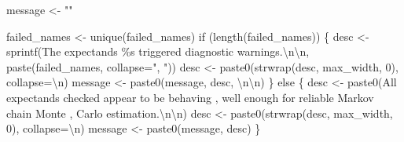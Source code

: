 \documentclass[
  letterpaper,
  DIV=11,
  numbers=noendperiod]{scrartcl}
\newenvironment{Shaded}{\begin{snugshade}}{\end{snugshade}}
\newcommand{\CharTok}[1]{\textcolor[rgb]{0.13,0.47,0.30}{#1}}
\newcommand{\ControlFlowTok}[1]{\textcolor[rgb]{0.00,0.23,0.31}{#1}}
\newcommand{\DecValTok}[1]{\textcolor[rgb]{0.68,0.00,0.00}{#1}}
\newcommand{\NormalTok}[1]{\textcolor[rgb]{0.00,0.23,0.31}{#1}}
\newcommand{\OperatorTok}[1]{\textcolor[rgb]{0.37,0.37,0.37}{#1}}
\newcommand{\SpecialCharTok}[1]{\textcolor[rgb]{0.37,0.37,0.37}{#1}}
\newcommand{\StringTok}[1]{\textcolor[rgb]{0.13,0.47,0.30}{#1}}
\begin{document}
\begin{Shaded}
\begin{Highlighting}[]
\NormalTok{  message }\OperatorTok{\textless{}{-}} \StringTok{""}
  
\NormalTok{  failed\_names }\OperatorTok{\textless{}{-}}\NormalTok{ unique(failed\_names)}
  \ControlFlowTok{if}\NormalTok{ (length(failed\_names)) \{}
\NormalTok{    desc }\OperatorTok{\textless{}{-}} 
\NormalTok{      sprintf(}\StringTok{\textquotesingle{}The expectands }\SpecialCharTok{\%s}\StringTok{ triggered diagnostic warnings.}\CharTok{\textbackslash{}n\textbackslash{}n}\StringTok{\textquotesingle{}}\NormalTok{,}
\NormalTok{              paste(failed\_names, collapse}\OperatorTok{=}\StringTok{", "}\NormalTok{))}
\NormalTok{    desc }\OperatorTok{\textless{}{-}}\NormalTok{ paste0(strwrap(desc, max\_width, }\DecValTok{0}\NormalTok{), collapse}\OperatorTok{=}\StringTok{\textquotesingle{}}\CharTok{\textbackslash{}n}\StringTok{\textquotesingle{}}\NormalTok{)}
\NormalTok{    message }\OperatorTok{\textless{}{-}}\NormalTok{ paste0(message, desc, }\StringTok{\textquotesingle{}}\CharTok{\textbackslash{}n\textbackslash{}n}\StringTok{\textquotesingle{}}\NormalTok{)}
\NormalTok{  \} }\ControlFlowTok{else}\NormalTok{ \{}
\NormalTok{    desc }\OperatorTok{\textless{}{-}}\NormalTok{ paste0(}\StringTok{\textquotesingle{}All expectands checked appear to be behaving \textquotesingle{}}\NormalTok{,}
                   \StringTok{\textquotesingle{}well enough for reliable Markov chain Monte \textquotesingle{}}\NormalTok{,}
                   \StringTok{\textquotesingle{}Carlo estimation.}\CharTok{\textbackslash{}n\textbackslash{}n}\StringTok{\textquotesingle{}}\NormalTok{)}
\NormalTok{    desc }\OperatorTok{\textless{}{-}}\NormalTok{ paste0(strwrap(desc, max\_width, }\DecValTok{0}\NormalTok{), collapse}\OperatorTok{=}\StringTok{\textquotesingle{}}\CharTok{\textbackslash{}n}\StringTok{\textquotesingle{}}\NormalTok{)}
\NormalTok{    message }\OperatorTok{\textless{}{-}}\NormalTok{ paste0(message, desc)}
\NormalTok{  \}}


\end{Highlighting}
\end{Shaded}
\end{document}
